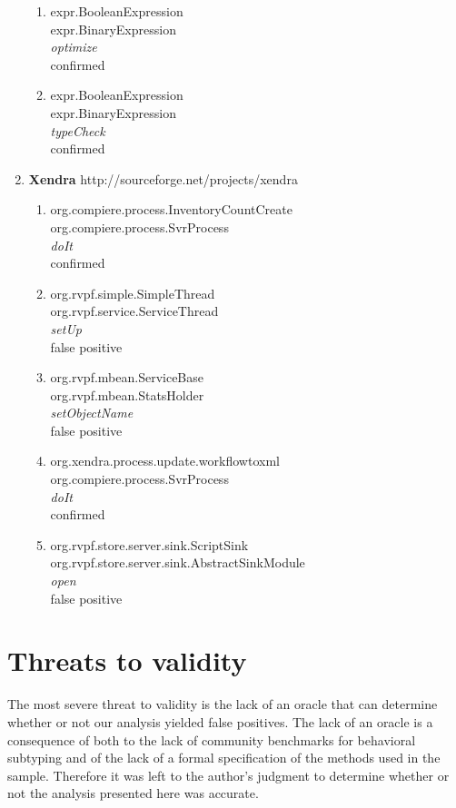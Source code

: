\documentclass{acm_proc_article-sp}
\begin{document}
\begin{enumerate}
\begin{enumerate}
     \item expr.BooleanExpression\\ 
     expr.BinaryExpression\\
     \emph{optimize}\\
     confirmed
   
     \item expr.BooleanExpression \\
      expr.BinaryExpression\\
     \emph{typeCheck}\\
     confirmed
  \end{enumerate}
  
\item \textbf{Xendra} http://sourceforge.net/projects/xendra
  \begin{enumerate}
    \item org.compiere.process.InventoryCountCreate\\
    org.compiere.process.SvrProcess\\
    \emph{doIt}\\
    confirmed
   
    \item org.rvpf.simple.SimpleThread\\
    org.rvpf.service.ServiceThread\\
    \emph{setUp}\\
    false positive
    
    \item org.rvpf.mbean.ServiceBase\\
    org.rvpf.mbean.StatsHolder\\
    \emph{setObjectName}\\
    false positive
    
    \item org.xendra.process.update.workflowtoxml\\ 
    org.compiere.process.SvrProcess\\
    \emph{doIt}\\
    confirmed
    
    \item org.rvpf.store.server.sink.ScriptSink\\
    org.rvpf.store.server.sink.AbstractSinkModule\\
    \emph{open}\\
    false positive
  \end{enumerate}  
\end{enumerate}

\section{Threats to validity}\label{section:threats}
The most severe threat to validity is the lack of an oracle that can determine whether or not our analysis yielded false positives. The lack of an oracle is a consequence of both to the lack of community benchmarks for behavioral subtyping and of the lack of a formal specification of the methods used in the sample. Therefore it was left to the author's judgment to determine whether or not the analysis presented here was accurate.
\end{document}
